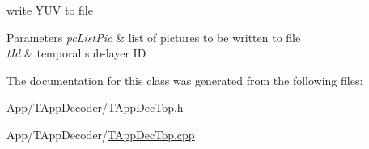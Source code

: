 write Y\+UV to file 


\begin{DoxyParams}{Parameters}
{\em pc\+List\+Pic} & list of pictures to be written to file \\
\hline
{\em t\+Id} & temporal sub-\/layer ID \\
\hline
\end{DoxyParams}


The documentation for this class was generated from the following files\+:\begin{DoxyCompactItemize}
\item 
App/\+T\+App\+Decoder/\hyperlink{_t_app_dec_top_8h}{T\+App\+Dec\+Top.\+h}\item 
App/\+T\+App\+Decoder/\hyperlink{_t_app_dec_top_8cpp}{T\+App\+Dec\+Top.\+cpp}\end{DoxyCompactItemize}
